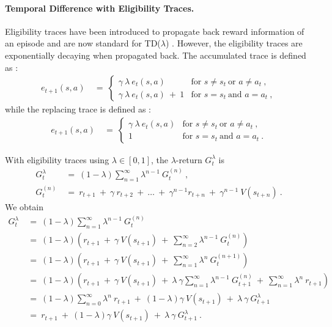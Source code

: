 \documentclass{article}
\begin{document}
\begin{appendices}
\paragraph{Temporal Difference with Eligibility Traces.}
Eligibility traces have been introduced to propagate
back reward information of an episode and are now standard for
TD($\lambda$) \cite{Singh:96}.
However, the eligibility traces are exponentially decaying when
propagated back.
The accumulated trace is defined as \cite{Singh:96}:
\begin{align}
  e_{t+1}(s,a) \ &= \
  \begin{cases}
    \gamma \ \lambda \ e_t(s,a) & \text{for } s \not=s_t \ \text{or }
    a \not=a_t \ , \\
    \gamma \ \lambda \ e_t(s,a) \ + \ 1 &
    \text{for } s =s_t \ \text{and } a =a_t \ , 
  \end{cases}
\end{align} 
while the replacing trace is defined as \cite{Singh:96}:
\begin{align}
  e_{t+1}(s,a) \ &= \
  \begin{cases}
    \gamma \ \lambda \ e_t(s,a) & \text{for } s \not=s_t \ \text{or }
    a \not=a_t \ , \\
    1 & \text{for } s =s_t \ \text{and } a =a_t \ . 
  \end{cases}
\end{align} 

With eligibility traces using $\lambda \in
[0,1]$, the $\lambda$-return $G_t^{\lambda}$ is \cite{Sutton:18book}
\begin{align}
  G_t^{\lambda} \ &= \ (1-\lambda) \sum_{n=1}^{\infty} \lambda^{n-1} \ G_t^{(n)} \ , \\
  G_t^{(n)} \ &= \ r_{t+1} \ + \ \gamma \ r_{t+2} \ + \ \ldots \ + \ \gamma^{n-1} r_{t+n} \ + \ 
  \gamma^{n-1} \ V(s_{t+n}) \ .
\end{align} 
We obtain
\begin{align}
  G_t^{\lambda} \ &= \ (1-\lambda) \sum_{n=1}^{\infty} \lambda^{n-1} \ G_t^{(n)}  \\ \nonumber
  &= \ 
  (1-\lambda) \left(r_{t+1} \ + \ \gamma \ V(s_{t+1}) \ + \ 
  \sum_{n=2}^{\infty} \lambda^{n-1} \ G_t^{(n)}\right) \\\nonumber
  &= \ 
  (1-\lambda) \left(r_{t+1} \ + \ \gamma \ V(s_{t+1}) \ + \ 
  \sum_{n=1}^{\infty} \lambda^{n} \ G_t^{(n+1)} \right) \\\nonumber
  &= \ 
  (1-\lambda) \left(r_{t+1} \ + \ \gamma \ V(s_{t+1}) \ + \ 
  \lambda \ \gamma \sum_{n=1}^{\infty} \lambda^{n-1} \ G_{t+1}^{(n)} \ + \  \sum_{n=1}^{\infty} \lambda^{n} \ r_{t+1} \right)\\\nonumber
  &= \ 
  (1-\lambda)  \sum_{n=0}^{\infty} \lambda^{n} \ r_{t+1} \ + \ 
  (1-\lambda) \gamma \ V(s_{t+1}) \ + \ \lambda \ \gamma \ G_{t+1}^{\lambda}\\\nonumber
  &= \  r_{t+1} \ + \ 
  (1-\lambda) \gamma \ V(s_{t+1}) \ + \ \lambda \ \gamma \ G_{t+1}^{\lambda} \ .
\end{align} 





\end{appendices}
\end{document}
